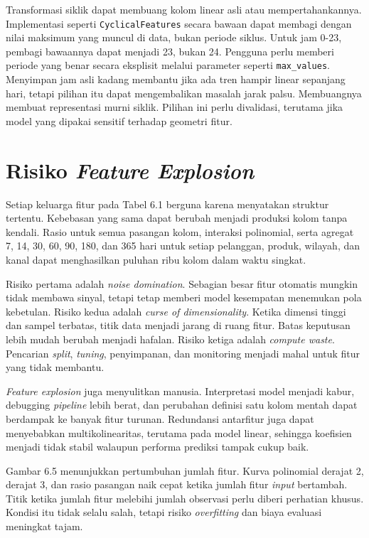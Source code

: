 Transformasi siklik dapat membuang kolom linear asli atau mempertahankannya. Implementasi seperti \passthrough{\lstinline!CyclicalFeatures!} secara bawaan dapat membagi dengan nilai maksimum yang muncul di data, bukan periode siklus. Untuk jam 0-23, pembagi bawaannya dapat menjadi 23, bukan 24. Pengguna perlu memberi periode yang benar secara eksplisit melalui parameter seperti \passthrough{\lstinline!max_values!}. Menyimpan jam asli kadang membantu jika ada tren hampir linear sepanjang hari, tetapi pilihan itu dapat mengembalikan masalah jarak palsu. Membuangnya membuat representasi murni siklik. Pilihan ini perlu divalidasi, terutama jika model yang dipakai sensitif terhadap geometri fitur.

\section{\texorpdfstring{Risiko \emph{Feature Explosion}}{Risiko Feature Explosion}}\label{risiko-feature-explosion}

Setiap keluarga fitur pada Tabel 6.1 berguna karena menyatakan struktur tertentu. Kebebasan yang sama dapat berubah menjadi produksi kolom tanpa kendali. Rasio untuk semua pasangan kolom, interaksi polinomial, serta agregat 7, 14, 30, 60, 90, 180, dan 365 hari untuk setiap pelanggan, produk, wilayah, dan kanal dapat menghasilkan puluhan ribu kolom dalam waktu singkat.

Risiko pertama adalah \emph{noise domination}. Sebagian besar fitur otomatis mungkin tidak membawa sinyal, tetapi tetap memberi model kesempatan menemukan pola kebetulan. Risiko kedua adalah \emph{curse of dimensionality}. Ketika dimensi tinggi dan sampel terbatas, titik data menjadi jarang di ruang fitur. Batas keputusan lebih mudah berubah menjadi hafalan. Risiko ketiga adalah \emph{compute waste}. Pencarian \emph{split}, \emph{tuning}, penyimpanan, dan monitoring menjadi mahal untuk fitur yang tidak membantu.

\emph{Feature explosion} juga menyulitkan manusia. Interpretasi model menjadi kabur, debugging \emph{pipeline} lebih berat, dan perubahan definisi satu kolom mentah dapat berdampak ke banyak fitur turunan. Redundansi antarfitur juga dapat menyebabkan multikolinearitas, terutama pada model linear, sehingga koefisien menjadi tidak stabil walaupun performa prediksi tampak cukup baik.

Gambar 6.5 menunjukkan pertumbuhan jumlah fitur. Kurva polinomial derajat 2, derajat 3, dan rasio pasangan naik cepat ketika jumlah fitur \emph{input} bertambah. Titik ketika jumlah fitur melebihi jumlah observasi perlu diberi perhatian khusus. Kondisi itu tidak selalu salah, tetapi risiko \emph{overfitting} dan biaya evaluasi meningkat tajam.

